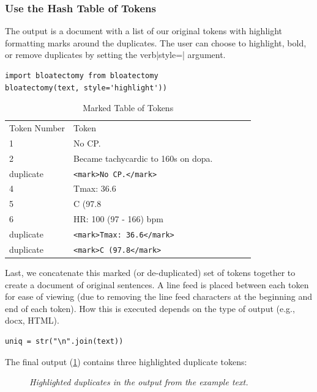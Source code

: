 \documentclass[runningheads,a4paper]{llncs}
\begin{document}
\subsubsection{Use the Hash Table of Tokens}
\noindent The output is a document with a list of our original tokens with highlight formatting marks around the duplicates. The user can choose to highlight, bold, or remove duplicates by setting the verb|style=| argument.

\begin{lstlisting}[frame=single, style=customcode]
import bloatectomy from bloatectomy
bloatectomy(text, style='highlight'))
\end{lstlisting}

\medskip\noindent%
\begin{table}
\caption{Marked Table of Tokens}
\begin{center}
\renewcommand{\arraystretch}{1.4}
\setlength\tabcolsep{3pt}
\begin{tabular}{llllll}
\hline\noalign{\smallskip}
Token Number & Token\\
\noalign{\smallskip}
\hline
\noalign{\smallskip}
 1 & No CP.\\
 2 & Became tachycardic to 160s on dopa. \\
duplicate & \verb|<mark>No CP.</mark> |\\
4 & Tmax: 36.6 \\
5 & C (97.8 \\
6 & HR: 100 (97 - 166) bpm\\
duplicate & \verb|<mark>Tmax: 36.6</mark>| \\
duplicate & \verb|<mark>C (97.8</mark>|\\
\hline
\end{tabular}
\end{center}
\end{table}


\noindent Last, we concatenate this marked (or de-duplicated) set of tokens together to create a document of original sentences. A line feed is placed between each token for ease of viewing (due to removing the line feed characters at the beginning and end of each token). How this is executed depends on the type of output (e.g., docx, HTML).

\begin{lstlisting}[frame=single, style=customcode]
uniq = str("\n".join(text))
\end{lstlisting}


\noindent The final output (\ref{output}) contains three highlighted duplicate tokens:  
\begin{figure}
 \caption {\emph{ Highlighted duplicates in the output from the example text.} }
 \label{output}
\end{figure}
\end{document}
